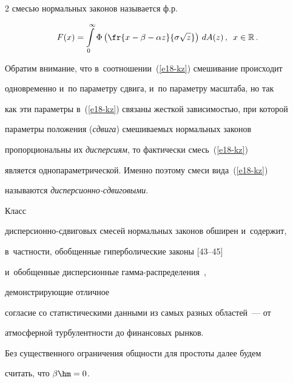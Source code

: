 \begin{multicols}{2}
смесью нормальных законов называется ф.р.


\begin{equation}


F(x)=\int\limits_{0}^{\infty}\Phi\left(\fr{x-\beta-\alpha


z}{\sigma\sqrt{z}}\right)\,dA(z)\,,\enskip x\in\mathbb{R}\,.


\label{e18-kz}


\end{equation}





Обратим внимание, что в~соотношении~(\ref{e18-kz}) смешивание происходит


одновременно и~по па\-ра\-мет\-ру сдвига, и~по параметру масштаба, но так


как эти параметры в~(\ref{e18-kz}) связаны жесткой за\-ви\-си\-мостью, при которой


параметры положения (\textit{сдвига}) смешиваемых нормальных законов


пропорциональны их \textit{дисперсиям}, то фактически смесь~(\ref{e18-kz})


является однопараметрической. Именно поэтому смеси вида~(\ref{e18-kz})


называются \textit{дис\-пер\-си\-он\-но-сдви\-го\-выми}. 


{





}





Класс


дис\-пер\-си\-он\-но-сдви\-го\-вых смесей нор\-маль\-ных законов обширен и~содержит,


в~част\-ности, обобщенные гиперболические законы \mbox{[43--45]}


и~обобщенные дисперсионные гам\-ма-рас\-пре\-де\-ле\-ния~\cite{KorolevSokolov2012, KorolevZaks2013}, 


демонстрирующие отличное


согласие со статистическими данными из самых разных областей~--- от


атмосферной турбулентности до финансовых рынков.





Без существенного ограничения общности для простоты далее будем


считать, что $\beta\hm=0$.






\end{multicols}
